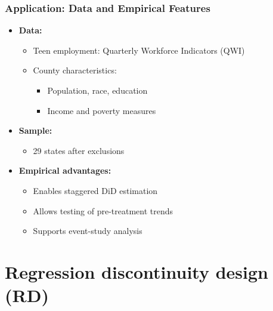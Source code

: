 \documentclass[12pt, compress]{beamer}
\begin{document}
\begin{frame}
	\frametitle{Application: Data and Empirical Features}

\begin{itemize}
	\item \textbf{Data:}
	\begin{itemize}
		\item Teen employment: Quarterly Workforce Indicators (QWI)
		\item County characteristics:
		\begin{itemize}
			\item Population, race, education
			\item Income and poverty measures
		\end{itemize}
	\end{itemize}
	
	\medskip
	
	\item \textbf{Sample:}
	\begin{itemize}
		\item 29 states after exclusions
	\end{itemize}
	
	\medskip
	
	\item \textbf{Empirical advantages:}
	\begin{itemize}
		\item Enables staggered DiD estimation
		\item Allows testing of pre-treatment trends
		\item Supports event-study analysis
	\end{itemize}
\end{itemize}

\end{frame}

\section{Regression discontinuity design (RD)}
\end{document}
